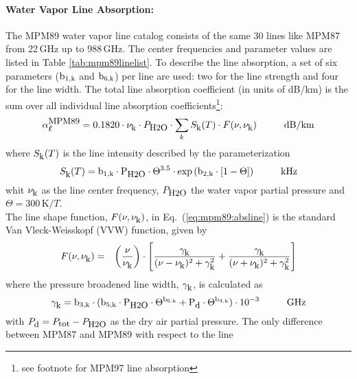 \paragraph{Water Vapor Line Absorption:}
\label{levele:mpm89_h2olines}
The MPM89 water vapor line catalog consists of the same 30 lines 
like MPM87 from 22\,GHz up to 988\,GHz. The center frequencies and parameter 
values are listed in Table \ref{tab:mpm89linelist}. To describe the line 
absorption, a set of six parameters ($\rm b_{\rm 1,k}$ and $\rm b_{\rm 6,k}$) per line are used: two 
for the line strength and four for the line width. The total line 
absorption coefficient (in units of dB/km) is the sum over all
individual line absorption coefficients\footnote{see footnote for
  MPM97 line absorption}:
\begin{equation}
  \label{eq:mpm89:absline}
  \alphampmml = 0.1820 \cdot \nuk \cdot \phzo \cdot 
  \sum_{k}{\inten \cdot \shape}\hspace*{10mm}\mbox{dB/km}
\end{equation}
where $S_{\mbox{\rm \small k}}(T)$ is the line intensity described by the parameterization
\begin{equation}
  \label{eq:mpm89:strength}
  \inten = \bek \cdot \phzo \cdot \Theta^{3.5} 
           \cdot \exp{(\bzk \cdot [1-\Theta])}\hspace*{10mm}\mbox{kHz}
\end{equation}
whit $\nu_{\mbox{\rm \small k}}$ as the line center frequency, $P_{\mbox{\rm \small H2O}}$ the water
vapor partial pressure and $\Theta = 300\,\mbox{K}/T$.\\
The line shape function, $F(\nu,\nu_{\mbox{\rm \small k}})$, in Eq.~(\ref{eq:mpm89:absline}) 
is the standard Van Vleck-Weisskopf (VVW) function, given by 
\begin{eqnarray}
  \label{eq:mpm89:VVW}
  F(\nu,\nu_{\mbox{\rm \small k}}) & = & \left(\frac{\nu}{\nu_{\mbox{\rm \small k}}}\right) \cdot 
               \left[\frac{\gamma_{\mbox{\rm \small k}}}{(\nu - \nu_{\mbox{\rm \small k}})^2 + \gamma_{\mbox{\rm \small k}}^2} + 
                     \frac{\gamma_{\mbox{\rm \small k}}}{(\nu + \nu_{\mbox{\rm \small k}})^2 + \gamma_{\mbox{\rm \small k}}^2}\right]
\end{eqnarray}
where the pressure broadened line width, $\gamma_{\mbox{\rm \small k}}$, is calculated as
\begin{equation}
  \label{eq:mpm89:gamma}
  \gamk = \bdk \cdot 
         (\bfk \cdot \phzo \cdot \Theta^{\bsk} + 
                     \pda  \cdot \Theta^{\bvk})
        \cdot 10^{-3}\hspace*{10mm}\mbox{GHz}
\end{equation}
with $P_{\mbox{\rm \small d}}=P_{\mbox{\rm \small tot}}-P_{\mbox{\rm \small H2O}}$ as the dry air partial pressure. 
The only difference between MPM87 and MPM89 with respect to the line 
